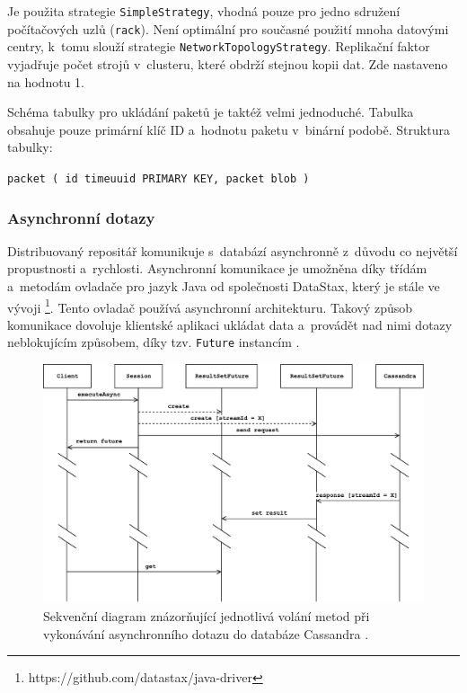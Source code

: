 \vspace{0.5cm}
\noindent Je použita strategie \texttt{SimpleStrategy}, vhodná pouze pro jedno sdružení počítačových uzlů (\texttt{rack}). Není optimální pro současné použití mnoha datovými centry, k~tomu slouží strategie \texttt{NetworkTopologyStrategy}. Replikační faktor vyjadřuje počet strojů v~clusteru, které obdrží stejnou kopii dat. Zde nastaveno na hodnotu 1.

Schéma tabulky pro ukládání paketů je taktéž velmi jednoduché. Tabulka obsahuje pouze primární klíč ID a~hodnotu paketu v~binární podobě. Struktura tabulky:

\vspace{0.5cm}
\texttt{packet (
	id timeuuid PRIMARY KEY,
	packet blob
)}

\subsubsection{Asynchronní dotazy}
Distribuovaný repositář komunikuje s~databází asynchronně z~důvodu co největší propustnosti a~rychlosti. Asynchronní komunikace je umožněna díky třídám a~metodám ovladače pro jazyk Java od společnosti DataStax, který je stále ve vývoji \footnote{https://github.com/datastax/java-driver}. Tento ovladač používá asynchronní architekturu. Takový způsob komunikace dovoluje klientské aplikaci ukládat data a~provádět nad nimi dotazy neblokujícím způsobem, díky tzv. \texttt{Future} instancím \cite{asyncQueriesCassandra}.

\begin{figure}[!h]
  \centering
  \includegraphics[width=15cm]{template-fig/CassandraAsyncQueries.pdf}
  \caption{Sekvenční diagram znázorňující jednotlivá volání metod při vykonávání asynchronního dotazu do databáze Cassandra \cite{asyncQueriesCassandra}.}
  \label{FIG_CassandraAsyncQueries}
\end{figure}

